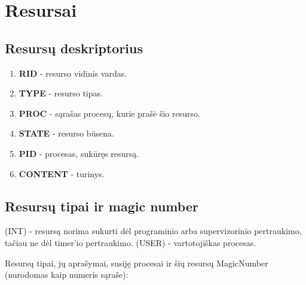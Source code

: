 \section{Resursai}
	\subsection{Resursų deskriptorius}
		\begin{enumerate}
			\item \textbf{RID} - resurso vidinis vardas.
			\item \textbf{TYPE} - resurso tipas.
			\item \textbf{PROC} - sąrašas procesų, kurie prašė šio resurso.
			\item \textbf{STATE} - resurso būsena.
			\item \textbf{PID} - procesas, sukūręs resursą.
			\item \textbf{CONTENT} - turinys.
		\end{enumerate}
	\subsection{Resursų tipai ir magic number}
		
		(INT) - resursą norima sukurti dėl programinio arba supervizorinio pertraukimo, tačiau ne dėl timer'io pertraukimo.
		(USER) - vartotojiškas procesas.
		
		Resursų tipai, jų aprašymai, susiję procesai ir šių resursų MagicNumber (nurodomas kaip numeris sąraše):\\
		
